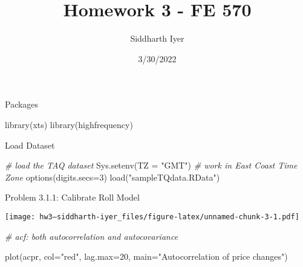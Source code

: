 \documentclass[
]{article}
\title{Homework 3 - FE 570}
\author{Siddharth Iyer}
\date{3/30/2022}
\newenvironment{Shaded}{\begin{snugshade}}{\end{snugshade}}
\newcommand{\AttributeTok}[1]{\textcolor[rgb]{0.77,0.63,0.00}{#1}}
\newcommand{\CommentTok}[1]{\textcolor[rgb]{0.56,0.35,0.01}{\textit{#1}}}
\newcommand{\ConstantTok}[1]{\textcolor[rgb]{0.00,0.00,0.00}{#1}}
\newcommand{\DecValTok}[1]{\textcolor[rgb]{0.00,0.00,0.81}{#1}}
\newcommand{\FunctionTok}[1]{\textcolor[rgb]{0.00,0.00,0.00}{#1}}
\newcommand{\NormalTok}[1]{#1}
\newcommand{\OtherTok}[1]{\textcolor[rgb]{0.56,0.35,0.01}{#1}}
\newcommand{\SpecialCharTok}[1]{\textcolor[rgb]{0.00,0.00,0.00}{#1}}
\newcommand{\StringTok}[1]{\textcolor[rgb]{0.31,0.60,0.02}{#1}}
\begin{document}
\maketitle

Packages

\begin{Shaded}
\begin{Highlighting}[]
\FunctionTok{library}\NormalTok{(xts)}
\FunctionTok{library}\NormalTok{(highfrequency)}
\end{Highlighting}
\end{Shaded}

Load Dataset

\begin{Shaded}
\begin{Highlighting}[]
\CommentTok{\# load the TAQ dataset}
\FunctionTok{Sys.setenv}\NormalTok{(}\AttributeTok{TZ =} \StringTok{"GMT"}\NormalTok{) }\CommentTok{\# work in East Coast Time Zone}
\FunctionTok{options}\NormalTok{(}\AttributeTok{digits.secs=}\DecValTok{3}\NormalTok{)}
\FunctionTok{load}\NormalTok{(}\StringTok{"sampleTQdata.RData"}\NormalTok{)}
\end{Highlighting}
\end{Shaded}

Problem 3.1.1: Calibrate Roll Model

\begin{Shaded}
\end{Shaded}

\texttt{[image: hw3---siddharth-iyer\_files/figure-latex/unnamed-chunk-3-1.pdf]}

\begin{Shaded}
\begin{Highlighting}[]
\CommentTok{\# acf: both autocorrelation and autocovariance}

\FunctionTok{plot}\NormalTok{(acpr, }\AttributeTok{col=}\StringTok{"red"}\NormalTok{, }\AttributeTok{lag.max=}\DecValTok{20}\NormalTok{, }
     \AttributeTok{main=}\StringTok{"Autocorrelation of price changes"}\NormalTok{)}
\end{Highlighting}
\end{Shaded}
\end{document}
